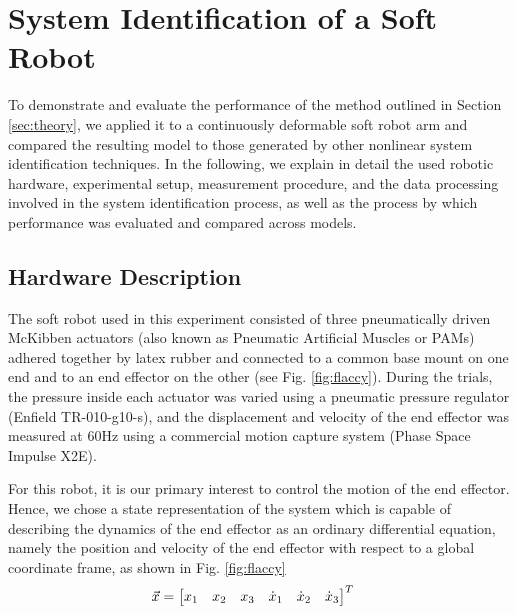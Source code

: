 \section{System Identification of a Soft Robot}
\label{sec:experiment}

To demonstrate and evaluate the performance of the method outlined in Section \ref{sec:theory}, we applied it to a continuously deformable soft robot arm and compared the resulting model to those generated by other nonlinear system identification techniques.
In the following, we explain in detail the used robotic hardware, experimental setup, measurement procedure, and the data processing involved in the system identification process, as well as the process by which performance was evaluated and compared across models.


\subsection{Hardware Description}

The soft robot used in this experiment consisted of three pneumatically driven McKibben actuators (also known as Pneumatic Artificial Muscles or PAMs) adhered together by latex rubber and connected to a common base mount on one end and to an end effector on the other (see Fig. \ref{fig:flaccy}).
During the trials, the pressure inside each actuator was varied using a pneumatic pressure regulator (Enfield TR-010-g10-s), and the displacement and velocity of the end effector was measured at $60 \text{Hz}$ using a commercial motion capture system (Phase Space Impulse X2E).

For this robot, it is our primary interest to control the motion of the end effector.
Hence, we chose a state representation of the system which is capable of describing the dynamics of the end effector as an ordinary differential equation, namely the position and velocity of the end effector with respect to a global coordinate frame, as shown in Fig. \ref{fig:flaccy}
\begin{align}
    \vec{x} &= \begin{bmatrix}  x_1 & x_2 & x_3 & \dot{x}_1 & \dot{x}_2 & \dot{x}_3  \end{bmatrix}^T
    \label{eq:state}
\end{align}


